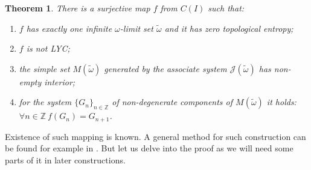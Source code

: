 \documentclass{amsart}
\newtheorem{theorem}{Theorem}
\begin{document}
\begin{theorem}
\label{ThmLim}
There is a surjective map $f$ from $C(I)$ such that:
\begin{enumerate}
\item $f$ has exactly one infinite $\omega$-limit set $\tilde{\omega}$ and it has zero topological entropy;
\item $f$ is not LYC;
\item the simple set $M(\tilde{\omega})$ generated by the associate system $\mathcal{J}(\tilde{\omega})$ has non-empty interior;
\item for the system $\{G_n\}_{n\in\mathbb{Z}}$ of non-degenerate components of $M(\tilde{\omega})$ it holds: $\forall n\in\mathbb{Z}\ f(G_n) = G_{n+1}$.
\end{enumerate}
\end{theorem}
Existence of such mapping is known. A general method for such construction can be found for example in \cite{BS}. But let us delve into the proof as we will need some parts of it in later constructions.
\end{document}
